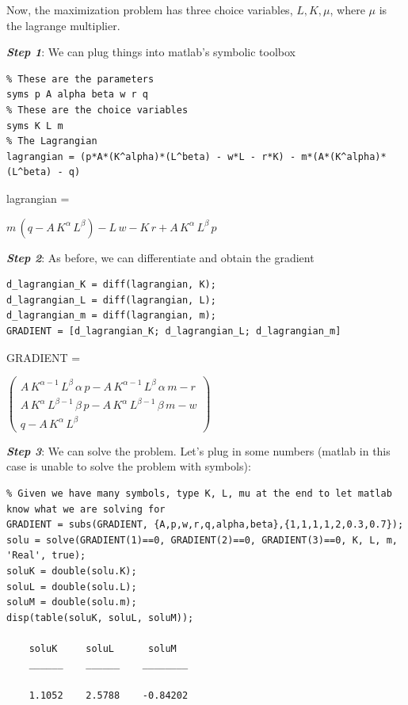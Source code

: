 \documentclass[
]{book}
\begin{document}
Now, the maximization problem has three choice variables, \(L,K,\mu\),
where \(\mu\) is the lagrange multiplier.

\textbf{\emph{Step 1}}: We can plug things into matlab's symbolic toolbox

\begin{verbatim}
% These are the parameters
syms p A alpha beta w r q
% These are the choice variables
syms K L m
% The Lagrangian
lagrangian = (p*A*(K^alpha)*(L^beta) - w*L - r*K) - m*(A*(K^alpha)*(L^beta) - q)
\end{verbatim}

lagrangian =

\(\displaystyle m\,{\left(q-A\,K^{\alpha } \,L^{\beta } \right)}-L\,w-K\,r+A\,K^{\alpha } \,L^{\beta } \,p\)

\textbf{\emph{Step 2}}: As before, we can differentiate and obtain the gradient

\begin{verbatim}
d_lagrangian_K = diff(lagrangian, K);
d_lagrangian_L = diff(lagrangian, L);
d_lagrangian_m = diff(lagrangian, m);  
GRADIENT = [d_lagrangian_K; d_lagrangian_L; d_lagrangian_m]
\end{verbatim}

GRADIENT =

\(\displaystyle \left(\begin{array}{c} A\,K^{\alpha -1} \,L^{\beta } \,\alpha \,p-A\,K^{\alpha -1} \,L^{\beta } \,\alpha \,m-r\\ A\,K^{\alpha } \,L^{\beta -1} \,\beta \,p-A\,K^{\alpha } \,L^{\beta -1} \,\beta \,m-w\\ q-A\,K^{\alpha } \,L^{\beta } \end{array}\right)\)

\textbf{\emph{Step 3}}: We can solve the problem. Let's plug in some numbers
(matlab in this case is unable to solve the problem with symbols):

\begin{verbatim}
% Given we have many symbols, type K, L, mu at the end to let matlab know what we are solving for
GRADIENT = subs(GRADIENT, {A,p,w,r,q,alpha,beta},{1,1,1,1,2,0.3,0.7});
solu = solve(GRADIENT(1)==0, GRADIENT(2)==0, GRADIENT(3)==0, K, L, m, 'Real', true);
soluK = double(solu.K);
soluL = double(solu.L);
soluM = double(solu.m);
disp(table(soluK, soluL, soluM));

    soluK     soluL      soluM  
    ______    ______    ________

    1.1052    2.5788    -0.84202
\end{verbatim}
\end{document}
